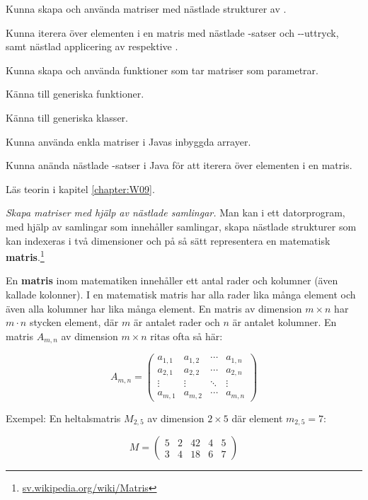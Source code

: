 

\Exercise{\ExeWeekNINE}

\begin{Goals}
\item Kunna skapa och använda matriser med nästlade strukturer av .
\item Kunna iterera över elementen i en matris med nästlade -satser och --uttryck, samt nästlad applicering av  respektive .
\item Kunna skapa och använda funktioner som tar matriser som parametrar.
\item Känna till generiska funktioner.
\item Känna till generiska klasser.
\item Kunna använda enkla matriser i Javas inbyggda arrayer.
\item Kunna anända nästlade -satser i Java för att iterera över elementen i en matris.
\end{Goals}

\begin{Preparations}
\item Läs teorin i kapitel \ref{chapter:W09}.
\end{Preparations}

\BasicTasks %

\Task \emph{Skapa matriser med hjälp av nästlade samlingar.} Man kan i ett datorprogram, med hjälp av samlingar som innehåller samlingar, skapa nästlade strukturer som kan indexeras i två dimensioner och på så sätt representera en matematisk \textbf{matris}.\footnote{\href{https://sv.wikipedia.org/wiki/Matris}{sv.wikipedia.org/wiki/Matris}} 
\begin{Background}
En \textbf{matris} inom matematiken innehåller ett antal rader och kolumner (även kallade kolonner). I en matematisk matris har alla rader lika många element och även alla kolumner har lika många element. En matris av dimension $m\times{}n$ har $m \cdot n$ stycken element, där $m$ är antalet rader och $n$ är antalet kolumner. En matris $A_{m,n}$ av dimension $m\times{}n$ ritas ofta så här:

\[
A_{m,n} = 
 \begin{pmatrix}
  a_{1,1} & a_{1,2} & \cdots & a_{1,n} \\
  a_{2,1} & a_{2,2} & \cdots & a_{2,n} \\
  \vdots  & \vdots  & \ddots & \vdots  \\
  a_{m,1} & a_{m,2} & \cdots & a_{m,n} 
 \end{pmatrix}
\]

\noindent Exempel: En heltalsmatris $M_{2,5}$ av dimension $2\times{}5$ där element $m_{2,5}=7$:

\[
M=
  \begin{pmatrix}
    5 & 2 & 42 & 4 & 5 \\
    3 & 4 & 18 & 6 & 7
  \end{pmatrix}
\]
\end{Background}

